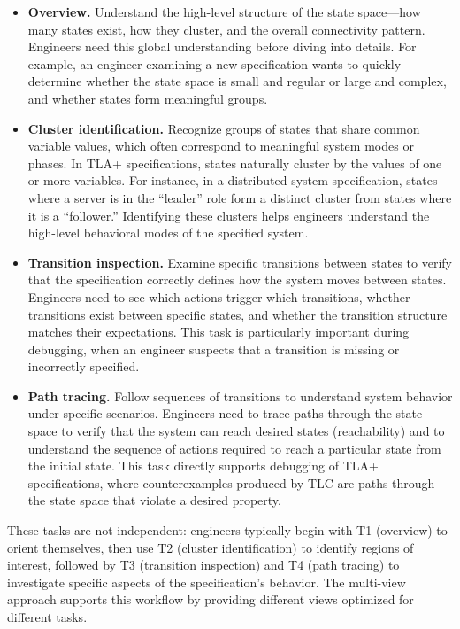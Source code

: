 \documentclass[conference]{IEEEtran}
\begin{document}
\begin{itemize}
\item[\textbf{T1.}] \textbf{Overview.} Understand the high-level structure of the state space---how many states exist, how they cluster, and the overall connectivity pattern. Engineers need this global understanding before diving into details. For example, an engineer examining a new specification wants to quickly determine whether the state space is small and regular or large and complex, and whether states form meaningful groups.

\item[\textbf{T2.}] \textbf{Cluster identification.} Recognize groups of states that share common variable values, which often correspond to meaningful system modes or phases. In TLA+ specifications, states naturally cluster by the values of one or more variables. For instance, in a distributed system specification, states where a server is in the ``leader'' role form a distinct cluster from states where it is a ``follower.'' Identifying these clusters helps engineers understand the high-level behavioral modes of the specified system.

\item[\textbf{T3.}] \textbf{Transition inspection.} Examine specific transitions between states to verify that the specification correctly defines how the system moves between states. Engineers need to see which actions trigger which transitions, whether transitions exist between specific states, and whether the transition structure matches their expectations. This task is particularly important during debugging, when an engineer suspects that a transition is missing or incorrectly specified.

\item[\textbf{T4.}] \textbf{Path tracing.} Follow sequences of transitions to understand system behavior under specific scenarios. Engineers need to trace paths through the state space to verify that the system can reach desired states (reachability) and to understand the sequence of actions required to reach a particular state from the initial state. This task directly supports debugging of TLA+ specifications, where counterexamples produced by TLC are paths through the state space that violate a desired property.
\end{itemize}

These tasks are not independent: engineers typically begin with T1 (overview) to orient themselves, then use T2 (cluster identification) to identify regions of interest, followed by T3 (transition inspection) and T4 (path tracing) to investigate specific aspects of the specification's behavior. The multi-view approach supports this workflow by providing different views optimized for different tasks.
\end{document}
